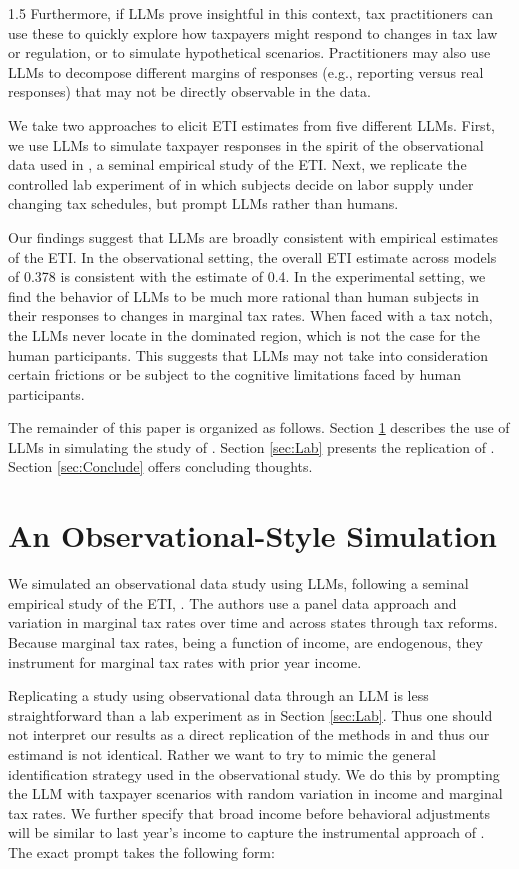\documentclass[letterpaper,9pt]{article}
\theoremstyle{definition}
\begin{document}
\begin{spacing}{1.5}
Furthermore, if LLMs prove insightful in this context, tax practitioners can use these to quickly explore how taxpayers might respond to changes in tax law or regulation, or to simulate hypothetical scenarios. Practitioners may also use LLMs to decompose different margins of responses (e.g., reporting versus real responses) that may not be directly observable in the data.

We take two approaches to elicit ETI estimates from five different LLMs. First,  we use LLMs to simulate taxpayer responses in the spirit of the observational data used in \cite{GruberSaez2002}, a seminal empirical study of the ETI. Next, we replicate the controlled lab experiment of \cite{PKNF2024} in which subjects decide on labor supply under changing tax schedules, but prompt LLMs rather than humans. 

Our findings suggest that LLMs are broadly consistent with empirical estimates of the ETI. In the observational setting, the overall ETI estimate across models of 0.378 is consistent with the \cite{GruberSaez2002} estimate of 0.4. In the experimental setting, we find the behavior of LLMs to be much more rational than human subjects in their responses to changes in marginal tax rates. When faced with a tax notch, the LLMs never locate in the dominated region, which is not the case for the human participants. This suggests that LLMs may not take into consideration certain frictions or be subject to the cognitive limitations faced by human participants.

The remainder of this paper is organized as follows. Section \ref{sec:Obs} describes the use of LLMs in simulating the study  of \cite{GruberSaez2002}. Section \ref{sec:Lab} presents the replication of \cite{PKNF2024}. Section \ref{sec:Conclude} offers concluding thoughts.

\section{An Observational-Style Simulation}
\label{sec:Obs}

We simulated an observational data study using LLMs, following a seminal empirical study of the ETI, \cite{GruberSaez2002}. The authors use a panel data approach and variation in marginal tax rates over time and across states through tax reforms.  Because marginal tax rates, being a function of income, are endogenous, they instrument for marginal tax rates with prior year income.

Replicating a study using observational data through an LLM is less straightforward than a lab experiment as in Section \ref{sec:Lab}. Thus one should not interpret our results as a direct replication of the methods in \cite{GruberSaez2002} and thus our estimand is not identical. Rather we want to try to mimic the general identification strategy used in the observational study. We do this by prompting the LLM with taxpayer scenarios with random variation in income and marginal tax rates.  We further specify that broad income before behavioral adjustments will be similar to last year’s income to capture the instrumental approach of \cite{GruberSaez2002}. The exact prompt takes the following form: \\



\end{spacing}
\end{document}
